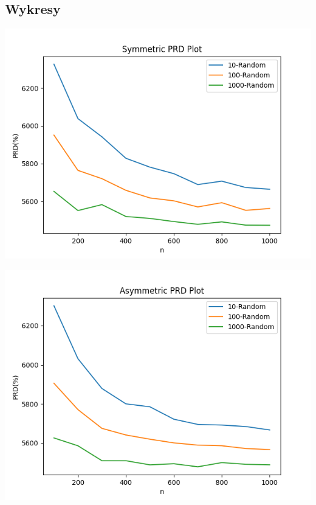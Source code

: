 \documentclass{article}
\begin{document}
\subsection{Wykresy}
\begin{center}
\includegraphics[width=\textwidth, 
                   height = 0.4\textheight, 
                   keepaspectratio]
                  {sym_k_random} 
\end{center}
\begin{center}
\includegraphics[width=\textwidth, 
                   height = 0.4\textheight, 
                   keepaspectratio]
                  {asym_k_random} 
\end{center}
\end{document}
